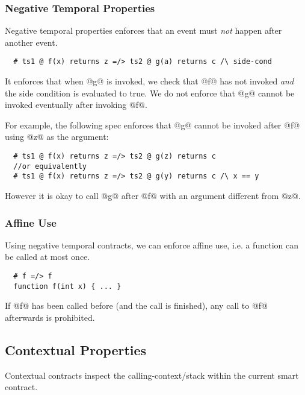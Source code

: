 
\subsubsection{Negative Temporal Properties}

Negative temporal properties enforces that an event must \emph{not}
happen after another event.

\begin{lstlisting}
  # ts1 @ f(x) returns z =/> ts2 @ g(a) returns c /\ side-cond
\end{lstlisting}
It enforces that when @g@ is invoked, we check that @f@ has not invoked
\emph{and} the side condition is evaluated to true.
We do not enforce that @g@ cannot be invoked eventually
after invoking @f@.

For example, the following spec enforces that @g@ cannot be
invoked after @f@ using @z@ as the argument:
\begin{lstlisting}
  # ts1 @ f(x) returns z =/> ts2 @ g(z) returns c
  //or equivalently
  # ts1 @ f(x) returns z =/> ts2 @ g(y) returns c /\ x == y
\end{lstlisting}
However it is okay to call @g@ after @f@ with an argument different from @z@.

\subsubsection*{Affine Use}

Using negative temporal contracts, we can enforce affine use, i.e.
a function can be called at most once.
\begin{lstlisting}
  # f =/> f
  function f(int x) { ... }
\end{lstlisting}
If @f@ has been called before (and the call is finished), any
call to @f@ afterwards is prohibited.



\subsection{Contextual Properties}

Contextual contracts inspect the calling-context/stack within the
current smart contract.


